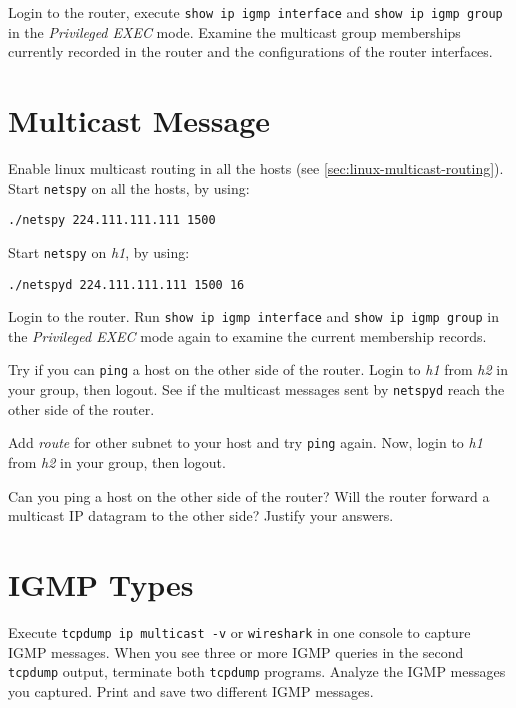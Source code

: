 \documentclass{../UTNetLab}
\begin{document}
    Login to the router, execute \lstinline{show ip igmp interface} and \lstinline{show ip igmp group} in the \textit{Privileged EXEC} mode.
    Examine the multicast group memberships currently recorded in the router and the configurations of the router interfaces.

\section{Multicast Message}
    Enable linux multicast routing in all the hosts (see \autoref{sec:linux-multicast-routing}).\\
    Start \lstinline{netspy} on all the hosts, by using:
    \begin{lstlisting}
./netspy 224.111.111.111 1500
    \end{lstlisting}
    Start \lstinline{netspy} on \textit{h1}, by using:
    \begin{lstlisting}
./netspyd 224.111.111.111 1500 16
    \end{lstlisting}
    
    Login to the router.
    Run \lstinline[language={cisco}]{show ip igmp interface} and \lstinline[language={cisco}]{show ip igmp group} in the \textit{Privileged EXEC} mode again to examine the current membership records.

    Try if you can \lstinline{ping} a host on the other side of the router.
    Login to \textit{h1} from \textit{h2} in your group, then logout.
    See if the multicast messages sent by \lstinline{netspyd} reach the other side of the router.

    Add \textit{route} for other subnet to your host and try \lstinline{ping} again.
    Now, login to \textit{h1} from \textit{h2} in your group, then logout.
    
    \begin{report}
    \item Can you ping a host on the other side of the router?
    Will the router forward a multicast IP datagram to the other side?
    Justify your answers.
    \end{report}

\section{IGMP Types}
    Execute \lstinline{tcpdump ip multicast -v} or \lstinline{wireshark} in one console to capture IGMP messages.
    When you see three or more IGMP queries in the second \lstinline{tcpdump} output, terminate both \lstinline{tcpdump} programs.
    Analyze the IGMP messages you captured.
    Print and save two different IGMP messages.
\end{document}
